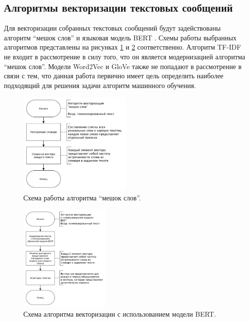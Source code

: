 \subsection{Алгоритмы векторизации текстовых сообщений}

Для векторизации собранных текстовых сообщений будут задействованы алгоритм ``мешок слов'' и языковая модель BERT \cite{bert}.
Схемы работы выбранных алгоритмов представлены на рисунках \ref{img:schemeBagOfWords} и \ref{img:schemeBert} соответственно.
Алгоритм TF-IDF не входит в рассмотрение в силу того, что он является модернизацией алгоритма ``мешок слов''. 
Модели Word2Vec \cite{word2vec} и GloVe \cite{glove} также не попадают в рассмотрение в связи с тем, что данная работа первично имеет цель определить наиболее подходящий для решения задачи алгоритм машинного обучения.

\begin{figure}[H]
	\centering
	\includegraphics[width=0.5\textwidth]{inc/schemeBagOfWords.pdf}
	\caption{ Схема работы алгоритма ``мешок слов''. }
	\label{img:schemeBagOfWords}
\end{figure}

\begin{figure}[H]
	\centering
	\includegraphics[width=0.4\textwidth]{inc/schemeBert.pdf}
	\caption{ Схема алгоритма векторизации с использованием модели BERT. }
	\label{img:schemeBert}
\end{figure}

